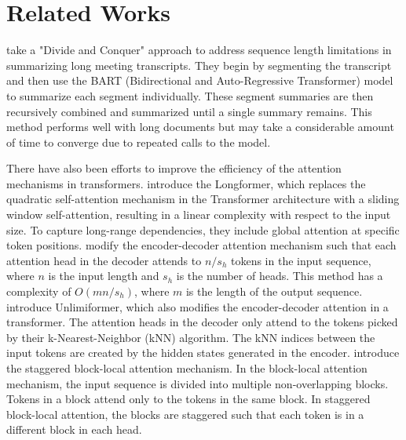 \section{Related Works}
	\label{sec:related-works}

	\citet{golia2024action} take a "Divide and Conquer" approach to address sequence length
	limitations in summarizing long meeting transcripts.
	They begin by segmenting the transcript and then use the BART (Bidirectional and Auto-Regressive
	Transformer) \cite{lewis-etal-2020-bart} model to summarize each segment individually.
	These segment summaries are then recursively combined and summarized until a single summary
	remains.
	This method performs well with long documents but may take a considerable amount of time to
	converge due to repeated calls to the model.

	There have also been efforts to improve the efficiency of the attention mechanisms in transformers.
	\citet{beltagy2020longformer} introduce the Longformer, which replaces the quadratic self-attention
	mechanism in the Transformer architecture with a sliding window self-attention, resulting in a
	linear complexity with respect to the input size.
	To capture long-range dependencies, they include global attention at specific token positions.
	\citet{huang-etal-2021-efficient} modify the encoder-decoder attention mechanism such that each
	attention head in the decoder attends to $n/s_h$ tokens in the input sequence, where $n$ is the input
	length and $s_h$ is the number of heads.
	This method has a complexity of $O(mn/s_h)$, where $m$ is the length of the output sequence.
	\citet{bertsch2023unlimiformer} introduce Unlimiformer, which also modifies the encoder-decoder
	attention in a transformer.
	The attention heads in the decoder only attend to the tokens picked by their k-Nearest-Neighbor (kNN)
	algorithm.
	The kNN indices between the input tokens are created by the hidden states generated in the encoder.
	\citet{phang2022investigating} introduce the staggered block-local attention mechanism.
	In the block-local attention mechanism, the input sequence is divided into multiple non-overlapping
	blocks.
	Tokens in a block attend only to the tokens in the same block.
	In staggered block-local attention, the blocks are staggered such that each token is in a different
	block in each head.


